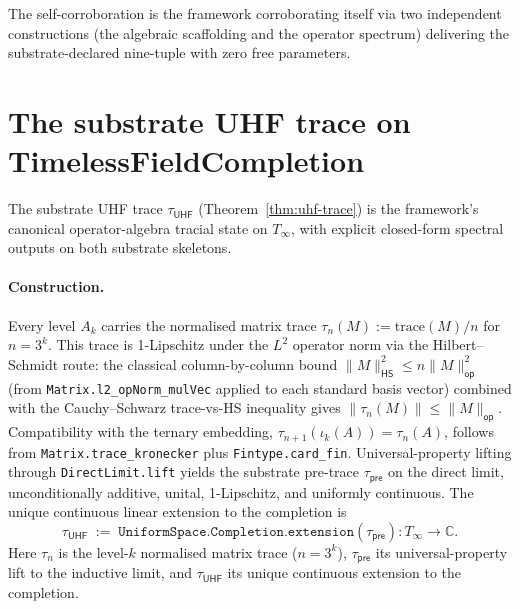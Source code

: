 \documentclass[11pt,a4paper]{amsart}
\theoremstyle{plain}
\theoremstyle{definition}
\begin{document}
The self-corroboration is the framework corroborating itself via two independent constructions (the algebraic scaffolding and the operator spectrum) delivering the substrate-declared nine-tuple with zero free parameters.

\section{The substrate UHF trace on TimelessFieldCompletion}\label{sec:tracial-state}

The substrate UHF trace $\tau_{\textsf{UHF}}$ (Theorem~\ref{thm:uhf-trace}) is the framework's canonical operator-algebra tracial state on $T_\infty$, with explicit closed-form spectral outputs on both substrate skeletons.

\paragraph{Construction.} Every level $A_k$ carries the normalised matrix trace $\tau_n(M) := \mathrm{trace}(M)/n$ for $n = 3^k$. This trace is 1-Lipschitz under the $L^2$ operator norm via the Hilbert--Schmidt route: the classical column-by-column bound $\|M\|_{\textsf{HS}}^2 \le n \|M\|_{\textsf{op}}^2$ (from \texttt{Matrix.l2\_opNorm\_mulVec} applied to each standard basis vector) combined with the Cauchy--Schwarz trace-vs-HS inequality gives $\|\tau_n(M)\| \le \|M\|_{\textsf{op}}$. Compatibility with the ternary embedding, $\tau_{n+1}(\iota_k(A)) = \tau_n(A)$, follows from \texttt{Matrix.trace\_kronecker} plus \texttt{Fintype.card\_fin}. Universal-property lifting through \texttt{DirectLimit.lift} yields the substrate pre-trace $\tau_{\textsf{pre}}$ on the direct limit, unconditionally additive, unital, 1-Lipschitz, and uniformly continuous. The unique continuous linear extension to the completion is
\[
\tau_{\textsf{UHF}} \;:=\; \texttt{UniformSpace.Completion.extension}(\tau_{\textsf{pre}}) \colon T_\infty \to \mathbb{C}.
\]
Here $\tau_n$ is the level-$k$ normalised matrix trace ($n = 3^k$), $\tau_{\textsf{pre}}$ its universal-property lift to the inductive limit, and $\tau_{\textsf{UHF}}$ its unique continuous extension to the completion.
\end{document}
